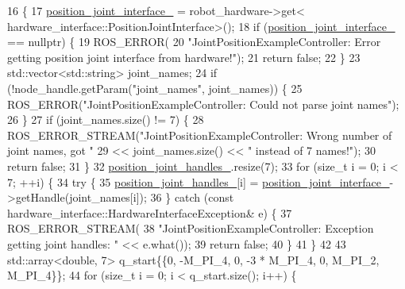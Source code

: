 \begin{DoxyCode}
16                                                                       \{
17   \hyperlink{classfranka__example__controllers_1_1JointPositionExampleController_a04b7891338d07eeb78febf6085190f83}{position\_joint\_interface\_} = robot\_hardware->get<
      hardware\_interface::PositionJointInterface>();
18   \textcolor{keywordflow}{if} (\hyperlink{classfranka__example__controllers_1_1JointPositionExampleController_a04b7891338d07eeb78febf6085190f83}{position\_joint\_interface\_} == \textcolor{keyword}{nullptr}) \{
19     ROS\_ERROR(
20         \textcolor{stringliteral}{"JointPositionExampleController: Error getting position joint interface from hardware!"});
21     \textcolor{keywordflow}{return} \textcolor{keyword}{false};
22   \}
23   std::vector<std::string> joint\_names;
24   \textcolor{keywordflow}{if} (!node\_handle.getParam(\textcolor{stringliteral}{"joint\_names"}, joint\_names)) \{
25     ROS\_ERROR(\textcolor{stringliteral}{"JointPositionExampleController: Could not parse joint names"});
26   \}
27   \textcolor{keywordflow}{if} (joint\_names.size() != 7) \{
28     ROS\_ERROR\_STREAM(\textcolor{stringliteral}{"JointPositionExampleController: Wrong number of joint names, got "}
29                      << joint\_names.size() << \textcolor{stringliteral}{" instead of 7 names!"});
30     \textcolor{keywordflow}{return} \textcolor{keyword}{false};
31   \}
32   \hyperlink{classfranka__example__controllers_1_1JointPositionExampleController_acaa5902db27586e01e48939526e27e5a}{position\_joint\_handles\_}.resize(7);
33   \textcolor{keywordflow}{for} (\textcolor{keywordtype}{size\_t} i = 0; i < 7; ++i) \{
34     \textcolor{keywordflow}{try} \{
35       \hyperlink{classfranka__example__controllers_1_1JointPositionExampleController_acaa5902db27586e01e48939526e27e5a}{position\_joint\_handles\_}[i] = 
      \hyperlink{classfranka__example__controllers_1_1JointPositionExampleController_a04b7891338d07eeb78febf6085190f83}{position\_joint\_interface\_}->getHandle(joint\_names[i]);
36     \} \textcolor{keywordflow}{catch} (\textcolor{keyword}{const} hardware\_interface::HardwareInterfaceException& e) \{
37       ROS\_ERROR\_STREAM(
38           \textcolor{stringliteral}{"JointPositionExampleController: Exception getting joint handles: "} << e.what());
39       \textcolor{keywordflow}{return} \textcolor{keyword}{false};
40     \}
41   \}
42 
43   std::array<double, 7> q\_start\{\{0, -M\_PI\_4, 0, -3 * M\_PI\_4, 0, M\_PI\_2, M\_PI\_4\}\};
44   \textcolor{keywordflow}{for} (\textcolor{keywordtype}{size\_t} i = 0; i < q\_start.size(); i++) \{

\end{DoxyCode}
